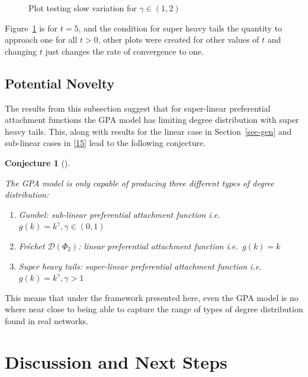 \documentclass[
  10pt,
  a4paper,
]{scrreprt}
\providecommand{\tightlist}{%
  \setlength{\itemsep}{0pt}\setlength{\parskip}{0pt}}\usepackage{longtable,booktabs,array}
\theoremstyle{definition}
\theoremstyle{plain}
\theoremstyle{plain}
\newtheorem{conjecture}{Conjecture}[section]
\theoremstyle{remark}
\begin{document}
{\begin{figure}[H]
{}

\caption{\label{fig-shtail}Plot testing slow variation for
\(\gamma \in (1,2)\)}

\end{figure}

Figure~\ref{fig-shtail} is for \(t=5\), and the condition for super
heavy tails the quantity to approach one for all \(t>0\), other plots
were created for other values of \(t\) and changing \(t\) just changes
the rate of convergence to one.

\hypertarget{potential-novelty}{%
\section{Potential Novelty}\label{potential-novelty}}

The results from this subsection suggest that for super-linear
preferential attachment functions the GPA model has limiting degree
distribution with super heavy tails. This, along with results for the
linear case in Section~\ref{sec-gen} and sub-linear cases in
{[}\protect\hyperlink{ref-barabasibook}{15}{]} lead to the following
conjecture.

\begin{conjecture}[]\protect\hypertarget{cnj-gpa}{}\label{cnj-gpa}

The GPA model is only capable of producing three different types of
degree distribution:

\begin{enumerate}
\def\labelenumi{\arabic{enumi}.}
\tightlist
\item
  Gumbel: sub-linear preferential attachment function
  i.e.~\(g(k)=k^\gamma, \gamma\in(0,1)\)
\item
  Fréchet \(\mathcal D(\Phi_2)\): linear preferential attachment
  function i.e.~\(g(k)=k\)
\item
  Super heavy tails: super-linear preferential attachment function
  i.e.\(g(k)=k^\gamma, \gamma>1\)
\end{enumerate}

\end{conjecture}

This means that under the framework presented here, even the GPA model
is no where near close to being able to capture the range of types of
degree distribution found in real networks.

\hypertarget{discussion-and-next-steps}{%
\chapter{Discussion and Next Steps}\label{discussion-and-next-steps}}

}
\end{document}
